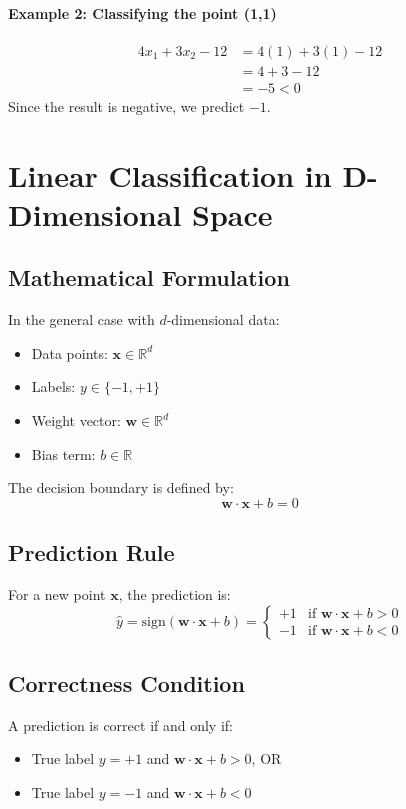 \documentclass{article}
\begin{document}
\paragraph{Example 2: Classifying the point (1,1)}
\begin{align}
    4x_1 + 3x_2 - 12 &= 4(1) + 3(1) - 12\\
    &= 4 + 3 - 12\\
    &= -5 < 0
\end{align}
Since the result is negative, we predict $-1$.

\section{Linear Classification in D-Dimensional Space}

\subsection{Mathematical Formulation}
In the general case with $d$-dimensional data:
\begin{itemize}
    \item Data points: $\mathbf{x} \in \mathbb{R}^d$
    \item Labels: $y \in \{-1, +1\}$
    \item Weight vector: $\mathbf{w} \in \mathbb{R}^d$
    \item Bias term: $b \in \mathbb{R}$
\end{itemize}

The decision boundary is defined by:
\[
\mathbf{w} \cdot \mathbf{x} + b = 0
\]

\subsection{Prediction Rule}
For a new point $\mathbf{x}$, the prediction is:
\[
\hat{y} = \text{sign}(\mathbf{w} \cdot \mathbf{x} + b) = 
\begin{cases}
+1 & \text{if } \mathbf{w} \cdot \mathbf{x} + b > 0\\
-1 & \text{if } \mathbf{w} \cdot \mathbf{x} + b < 0
\end{cases}
\]

\subsection{Correctness Condition}
A prediction is correct if and only if:
\begin{itemize}
    \item True label $y = +1$ and $\mathbf{w} \cdot \mathbf{x} + b > 0$, OR
    \item True label $y = -1$ and $\mathbf{w} \cdot \mathbf{x} + b < 0$
\end{itemize}
\end{document}
